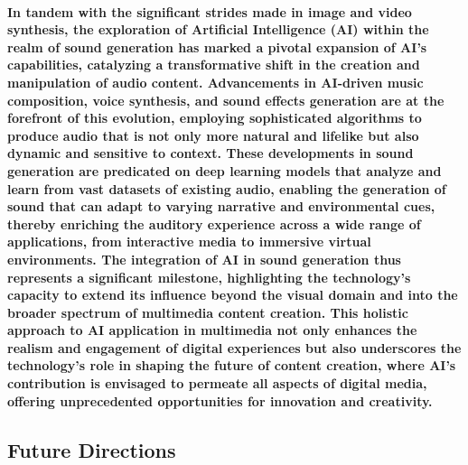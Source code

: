 \documentclass[11pt,a4paper,oneside]{report}
\begin{document}
\paragraph{In tandem with the significant strides made in image and video synthesis, the exploration of Artificial Intelligence (AI) within the realm of sound generation has marked a pivotal expansion of AI's capabilities, catalyzing a transformative shift in the creation and manipulation of audio content. Advancements in AI-driven music composition, voice synthesis, and sound effects generation are at the forefront of this evolution, employing sophisticated algorithms to produce audio that is not only more natural and lifelike but also dynamic and sensitive to context. These developments in sound generation are predicated on deep learning models that analyze and learn from vast datasets of existing audio, enabling the generation of sound that can adapt to varying narrative and environmental cues, thereby enriching the auditory experience across a wide range of applications, from interactive media to immersive virtual environments. The integration of AI in sound generation thus represents a significant milestone, highlighting the technology's capacity to extend its influence beyond the visual domain and into the broader spectrum of multimedia content creation. This holistic approach to AI application in multimedia not only enhances the realism and engagement of digital experiences but also underscores the technology's role in shaping the future of content creation, where AI's contribution is envisaged to permeate all aspects of digital media, offering unprecedented opportunities for innovation and creativity.}

\subsection{Future Directions}
\end{document}
